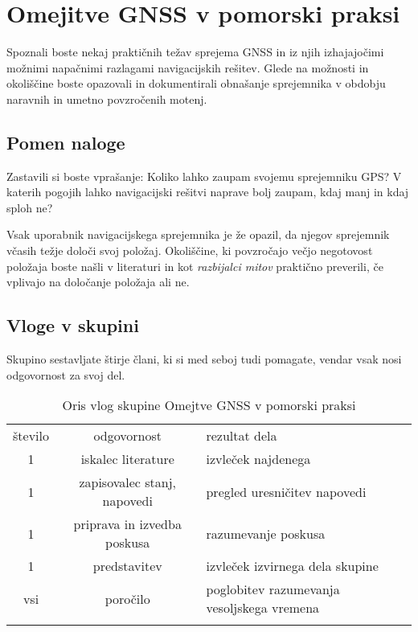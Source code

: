 %
\chapter{Omejitve GNSS v pomorski praksi}
\label{Vaje:GnssPraks} %

Spoznali boste nekaj praktičnih težav sprejema GNSS in iz njih izhajajočimi možnimi napačnimi razlagami navigacijskih rešitev. Glede na možnosti in okoliščine boste opazovali in dokumentirali obnašanje sprejemnika v obdobju naravnih in umetno povzročenih motenj.

\section{Pomen naloge}
\label{sec:GnnsPomen}

Zastavili si boste vprašanje: Koliko lahko zaupam svojemu sprejemniku GPS? V katerih pogojih lahko navigacijski rešitvi naprave bolj zaupam, kdaj manj in kdaj sploh ne?

Vsak uporabnik navigacijskega sprejemnika je že opazil, da njegov sprejemnik včasih težje določi svoj položaj. Okoliščine, ki povzročajo večjo negotovost položaja boste našli v literaturi in kot \textit{razbijalci mitov} praktično preverili, če vplivajo na določanje položaja ali ne.  

\section{Vloge v skupini}
\label{sec:Gnss_Vloge}
Skupino sestavljate štirje člani, ki si med seboj tudi pomagate, vendar vsak nosi odgovornost za svoj del.

\begin{table}
	\centering
	\caption{Oris vlog skupine Omejtve GNSS v pomorski praksi}
	\label{tab:GnssVloge} 
	\begin{tabular}{c|c|l}
		\hline\noalign{\bigskip}
		število & odgovornost                 & rezultat dela \\
		\noalign{\smallskip}\hline\noalign{\smallskip}
		1       & iskalec literature          & izvleček najdenega\\
		1       & zapisovalec stanj, napovedi & pregled uresničitev napovedi \\
		1       & priprava in izvedba poskusa & razumevanje poskusa \\
		1       & predstavitev                & izvleček izvirnega dela skupine \\ \hline
		vsi     & poročilo                    & poglobitev razumevanja vesoljskega vremena\\
		\noalign{\smallskip}\hline
	\end{tabular}
\end{table}

